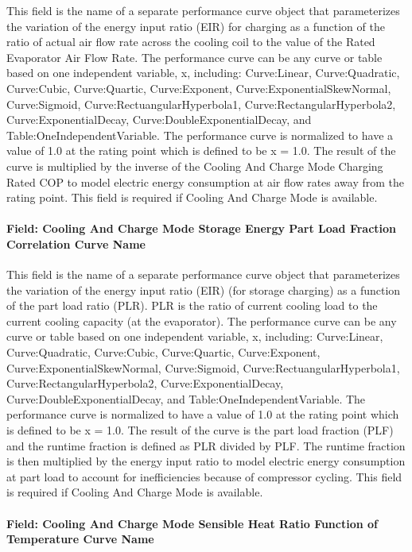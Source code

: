 This field is the name of a separate performance curve object that parameterizes the variation of the energy input ratio (EIR) for charging as a function of the ratio of actual air flow rate across the cooling coil to the value of the Rated Evaporator Air Flow Rate. The performance curve can be any curve or table based on one independent variable, x, including: Curve:Linear, Curve:Quadratic, Curve:Cubic, Curve:Quartic, Curve:Exponent, Curve:ExponentialSkewNormal, Curve:Sigmoid, Curve:RectuangularHyperbola1, Curve:RectangularHyperbola2, Curve:ExponentialDecay, Curve:DoubleExponentialDecay, and Table:OneIndependentVariable. The performance curve is normalized to have a value of 1.0 at the rating point which is defined to be x = 1.0. The result of the curve is multiplied by the inverse of the Cooling And Charge Mode Charging Rated COP to model electric energy consumption at air flow rates away from the rating point. This field is required if Cooling And Charge Mode is available.

\paragraph{Field: Cooling And Charge Mode Storage Energy Part Load Fraction Correlation Curve Name}\label{field-cooling-and-charge-mode-storage-energy-part-load-fraction-correlation-curve-name}

This field is the name of a separate performance curve object that parameterizes the variation of the energy input ratio (EIR) (for storage charging) as a function of the part load ratio (PLR). PLR is the ratio of current cooling load to the current cooling capacity (at the evaporator). The performance curve can be any curve or table based on one independent variable, x, including: Curve:Linear, Curve:Quadratic, Curve:Cubic, Curve:Quartic, Curve:Exponent, Curve:ExponentialSkewNormal, Curve:Sigmoid, Curve:RectuangularHyperbola1, Curve:RectangularHyperbola2, Curve:ExponentialDecay, Curve:DoubleExponentialDecay, and Table:OneIndependentVariable. The performance curve is normalized to have a value of 1.0 at the rating point which is defined to be x = 1.0. The result of the curve is the part load fraction (PLF) and the runtime fraction is defined as PLR divided by PLF. The runtime fraction is then multiplied by the energy input ratio to model electric energy consumption at part load to account for inefficiencies because of compressor cycling. This field is required if Cooling And Charge Mode is available.

\paragraph{Field: Cooling And Charge Mode Sensible Heat Ratio Function of Temperature Curve Name}\label{field-cooling-and-charge-mode-sensible-heat-ratio-function-of-temperature-curve-name}

